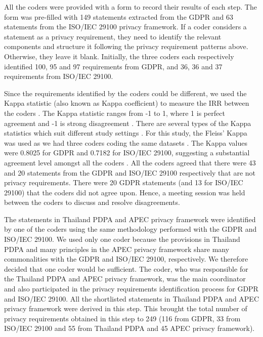 All the coders were provided with a form to record their results of each step. The form was pre-filled with 149 statements extracted from the GDPR and 63 statements from the ISO/IEC 29100 privacy framework. If a coder considers a statement as a privacy requirement, they need to identify the relevant components and structure it following the privacy requirement patterns above. Otherwise, they leave it blank. Initially, the three coders each respectively identified 100, 95 and 97 requirements from GDPR, and 36, 36 and 37 requirements from ISO/IEC 29100.

Since the requirements identified by the coders could be different, we used the Kappa statistic (also known as Kappa coefficient) to measure the IRR between the coders \cite{Viera2005}. The Kappa statistic ranges from -1 to 1, where 1 is perfect agreement and -1 is strong disagreement \cite{Viera2005}. There are several types of the Kappa statistics which suit different study settings \cite{Hallgren}. For this study, the Fleiss' Kappa was used as we had three coders coding the same datasets \cite{Fleiss1971}. The Kappa values were 0.8025 for GDPR and 0.7182 for ISO/IEC 29100, suggesting a substantial agreement level amongst all the coders \cite{Landis1977}. All the coders agreed that there were 43 and 20 statements from the GDPR and ISO/IEC 29100 respectively that are not privacy requirements. There were 20 GDPR statements (and 13 for ISO/IEC 29100) that the coders did not agree upon. Hence, a meeting session was held between the coders to discuss and resolve disagreements. 

The statements in Thailand PDPA and APEC privacy framework were identified by one of the coders using the same methodology performed with the GDPR and ISO/IEC 29100. We used only one coder because the provisions in Thailand PDPA and many principles in the APEC privacy framework share many commonalities with the GDPR and ISO/IEC 29100, respectively. We therefore decided that one coder would be sufficient. The coder, who was responsible for the Thailand PDPA and APEC privacy framework, was the main coordinator and also participated in the privacy requirements identification process for GDPR and ISO/IEC 29100. All the shortlisted statements in Thailand PDPA and APEC privacy framework were derived in this step. This brought the total number of privacy requirements obtained in this step to 249 (116 from GDPR, 33 from ISO/IEC 29100 and 55 from Thailand PDPA and 45 APEC privacy framework).


